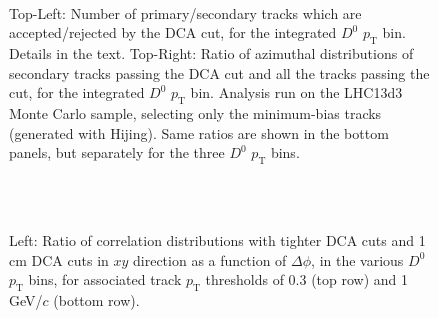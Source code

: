 \begin{figure}[h]
\centering
{}
 \\
 \caption{Top-Left: Number of primary/secondary tracks which are accepted/rejected by the DCA cut, for the integrated $D^0$ $p_\text{T}$ bin. Details in the text. Top-Right: Ratio of azimuthal distributions of secondary tracks passing the DCA cut and all the tracks passing the cut, for the integrated $D^0$ $p_\text{T}$ bin. Analysis run on the LHC13d3 Monte Carlo sample, selecting only the minimum-bias tracks (generated with Hijing). Same ratios are shown in the bottom panels, but separately for the three $D^0$ $p_\text{T}$ bins.}
 \label{fig:DCA}
\end{figure}

\begin{figure}[h]
\centering
{}
 \\
 \\
 \caption{Left: Ratio of correlation distributions with tighter DCA cuts and 1 cm DCA cuts in $xy$ direction as a function of $\Delta\phi$, in the various $D^0$ $p_\text{T}$ bins, for associated track $p_\text{T}$ thresholds of 0.3 (top row) and 1 GeV/$c$ (bottom row).}
 \label{fig:DCADati}
\end{figure}

